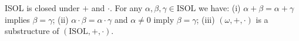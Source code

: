 ISOL is closed under $+$ and $\cdot$. For any $\alpha, \beta, \gamma \in \text{ISOL}$ we have:
(i) $\alpha + \beta = \alpha + \gamma$ implies $\beta = \gamma$;
(ii) $\alpha \cdot \beta = \alpha \cdot \gamma$ and $\alpha \neq 0$ imply $\beta = \gamma$;
(iii) $(\omega, +, \cdot)$ is a substructure of $(\text{ISOL}, +, \cdot)$.